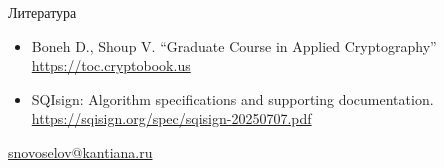 \documentclass{beamer}
\begin{document}
\begin{frame}{Литература}
	\begin{scriptsize}
	\begin{itemize}
		\item[\structure{{\faBook}}] Boneh D., Shoup V. ``Graduate Course in Applied Cryptography''
		\url{https://toc.cryptobook.us}
		\vspace{0.5em}

		\item[\structure{{\faGlobe}}] SQIsign: Algorithm specifications and supporting documentation. \url{https://sqisign.org/spec/sqisign-20250707.pdf}
		\vspace{0.5em}
%
	\end{itemize}
	\end{scriptsize}
	

    \begin{center}
        \begin{tcolorbox}[enhanced,hbox,colback=block-green-color-bg,colframe=subsection-color!120,title=Контакты,center title]
            \begin{varwidth}{\textwidth}
                \begin{center}
                    \href{mailto:snovoselov@kantiana.ru}{snovoselov@kantiana.ru}
                \end{center}
            \end{varwidth}
        \end{tcolorbox}
    \end{center}
\end{frame}

\end{document}
